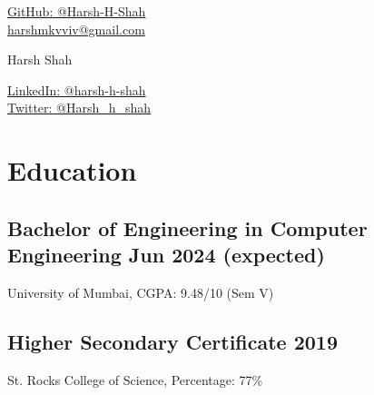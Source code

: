 \documentclass[a4,10pt]{article}
\begin{document}
\begin{center}
    \begin{minipage}[b]{0.24\textwidth}
    \large  %
            {\href{https://www.github.com/harsh-h-shah/}{
            \color{UI_blue} GitHub: @Harsh-H-Shah} } \\
            \large \href{mailto:harshmkvviv@gmail.com}{
            \color{UI_blue} harshmkvviv@gmail.com} 
    \end{minipage}%
    \begin{minipage}[b]{0.5\textwidth}
            \centering
            {\Huge Harsh Shah} \\ %
            \vspace{0.1cm}
    \end{minipage}%
    \begin{minipage}[b]{0.24\textwidth}
            \flushright \large  %
            {\href{https://www.linkedin.com/in/harsh-h-shah/}{
            \color{UI_blue} LinkedIn: @harsh-h-shah} } \\
            \href{https://twitter.com/Harsh_h_shah}{
            \color{UI_blue} Twitter: @Harsh\_h\_shah}
    \end{minipage}   
    
\vspace{-0.3cm} 
\end{center}


\section{Education}
\vspace{-0.1cm}
\subsection*{Bachelor of Engineering in Computer Engineering \hfill Jun 2024 (expected)}{\normalsize \normalfont University of Mumbai, CGPA: 9.48/10 (Sem V)}
\vspace{-0.4cm}
\subsection*{Higher Secondary Certificate \hfill 2019} {\normalsize \normalfont St. Rocks College of Science, Percentage: 77\%}
\vspace{-0.4cm}
\end{document}
